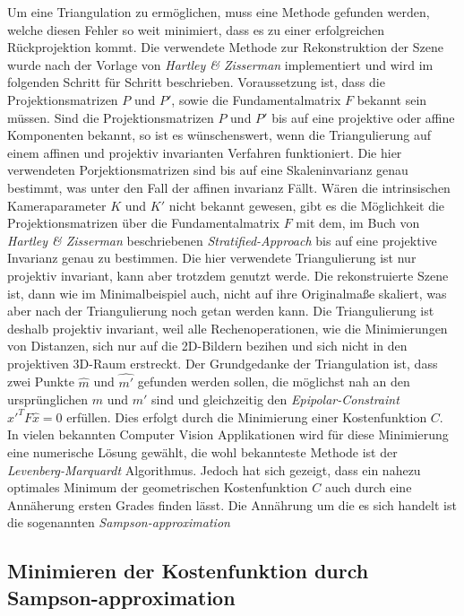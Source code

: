Um eine Triangulation zu ermöglichen, muss eine Methode gefunden werden, welche diesen Fehler so weit minimiert, dass es zu einer erfolgreichen Rückprojektion kommt. Die verwendete Methode zur Rekonstruktion der Szene wurde nach der Vorlage von \textit{Hartley \& Zisserman}\cite{HZ} implementiert und wird im folgenden Schritt für Schritt beschrieben. Voraussetzung ist, dass die Projektionsmatrizen $P$ und $P'$, sowie die Fundamentalmatrix $F$ bekannt sein müssen. Sind die Projektionsmatrizen $P$ und $P'$ bis auf eine projektive oder affine Komponenten bekannt, so ist es wünschenswert, wenn die Triangulierung auf einem affinen und projektiv invarianten Verfahren funktioniert\cite{HZ}. Die hier verwendeten Porjektionsmatrizen sind bis auf eine Skaleninvarianz genau bestimmt, was unter den Fall der affinen invarianz Fällt. Wären die intrinsischen Kameraparameter $K$ und $K'$ nicht bekannt gewesen, gibt es die Möglichkeit die Projektionsmatrizen über die Fundamentalmatrix $F$ mit dem, im Buch von \textit{Hartley \& Zisserman} beschriebenen  \textit{Stratified-Approach} bis auf eine projektive Invarianz genau zu bestimmen\cite{HZ}. Die hier verwendete Triangulierung ist nur projektiv invariant, kann aber trotzdem genutzt werde. Die rekonstruierte Szene ist, dann wie im Minimalbeispiel auch, nicht auf ihre Originalmaße skaliert, was aber nach der Triangulierung noch getan werden kann. Die Triangulierung ist deshalb projektiv invariant, weil alle Rechenoperationen, wie die Minimierungen von Distanzen, sich nur auf die 2D-Bildern bezihen und sich nicht in den projektiven 3D-Raum erstreckt\cite{HZ}. Der Grundgedanke der Triangulation ist, dass zwei Punkte $\hat{m}$ und $\hat{m'}$ gefunden werden sollen, die möglichst nah an den ursprünglichen $m$ und $m'$ sind und gleichzeitig den \textit{Epipolar-Constraint} $\hat{x}'^TF\hat{x} = 0$ erfüllen. Dies erfolgt durch die Minimierung einer Kostenfunktion $C$. In vielen bekannten Computer Vision Applikationen wird für diese Minimierung eine numerische Lösung gewählt, die wohl bekannteste Methode ist der \textit{Levenberg-Marquardt} Algorithmus\cite{HZ}. Jedoch hat sich gezeigt, dass ein nahezu optimales Minimum der geometrischen Kostenfunktion $C$ auch durch eine Annäherung ersten Grades finden lässt. Die Annährung um die es sich handelt ist die sogenannten \textit{Sampson-approximation}


\subsection{Minimieren der Kostenfunktion durch Sampson-approximation}


